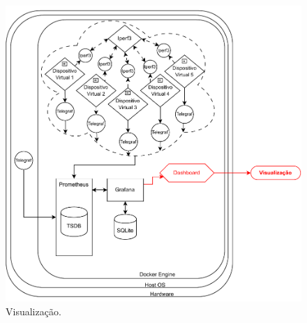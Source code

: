




\begin{figure}[H]
\centering
\setlength{\abovecaptionskip}{-20pt}
\includegraphics[width=\textwidth]{Imagens/chap03/by-blocks/dashboard_diagram.pdf}
\caption{Visualização.}
\label{fig:DiagramaVisualizacao}
\end{figure}


